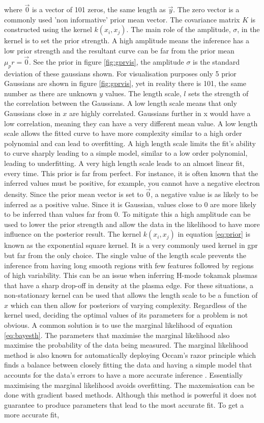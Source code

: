 \noindent where $\vec 0$ is a vector of 101 zeros, the same length as $\vec y$. The zero vector is a commonly used 'non informative' prior mean vector. The covariance matrix $K$ is constructed using the kernel $k(x_i,x_j)$. The main role of the amplitude, $\sigma$, in the kernel is to set the prior strength. A high amplitude means the inference has a low prior strength and the resultant curve can be far from the prior mean $\mu_pr = \vec 0$. See the prior in figure \ref{fig:gprvis}, the amplitude $\sigma$ is the standard deviation of these gaussians shown. For visualisation purposes only 5 prior Gaussians are shown in figure \ref{fig:gprvis}, yet in reality there is 101, the same number as there are unknown $y$ values. The length scale, $l$ sets the strength of the correlation between the Gaussians. A low length scale means that only Gaussians close in $x$ are highly correlated. Gaussians further in x would have a low correlation, meaning they can have a very different mean value. A low length scale allows the fitted curve to have more complexity similar to a high order polynomial and can lead to overfitting. A high length scale limits the fit's ability to curve sharply leading to a simple model, similar to a low order polynomial, leading to underfitting. A very high length scale leads to an almost linear fit, every time. This prior is far from perfect. For instance, it is often known that the inferred values must be positive, for example, you cannot have a negative electron density. Since the prior mean vector is set to $\vec{0}$, a negative value is as likely to be inferred as a positive value. Since it is Gaussian, values close to 0 are more likely to be inferred than values far from 0. To mitigate this a high amplitude can be used to lower the prior strength and allow the data in the likelihood to have more influence on the posterior result. The kernel $k(x_i,x_j)$ in equation \ref{eq:prior} is known as the exponential square kernel. It is a very commonly used kernel in \gls{gpr} but far from the only choice. The single value of the length scale prevents the inference from having long smooth regions with few features followed by regions of high variability. This can be an issue when inferring H-mode tokamak plasmas that have a sharp drop-off in density at the plasma edge. For these situations, a non-stationary kernel can be used that allows the length scale to be a function of $x$ which can then allow for posteriors of varying complexity. Regardless of the kernel used, deciding the optimal values of its parameters for a problem is not obvious. A common solution is to use the marginal likelihood of equation \ref{eq:bayesth}. The parameters that maximise the marginal likelihood also maximise the probability of the data being measured. The marginal likelihood method is also known for automatically deploying Occam's razor principle which finds a balance between closely fitting the data and having a simple model that accounts for the data's errors to have a more accurate inference \cite{oscraz} \cite{gp4ml}. Essentially maximising the marginal likelihood avoids overfitting. The maxemisation can be done with gradient based methods. Although this method is powerful it does not guarantee to produce parameters that lead to the most accurate fit. To get a more accurate fit, 